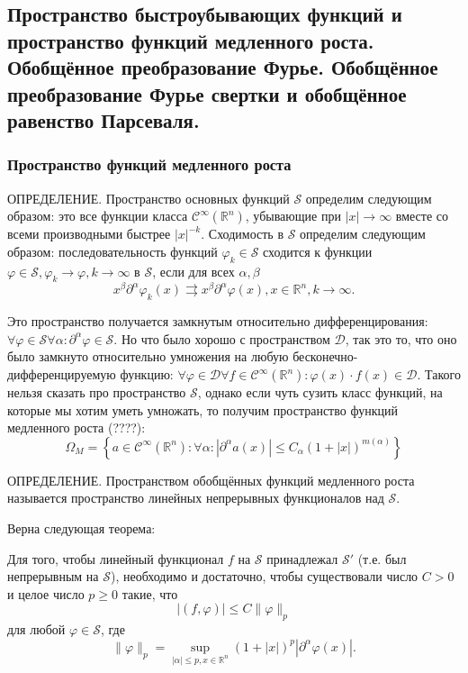 \subsection{Пространство быстроубывающих функций и пространство функций медленного роста.
Обобщённое преобразование Фурье. Обобщённое преобразование Фурье свертки и обобщённое равенство
Парсеваля.}

\subsubsection{Пространство функций медленного роста}

ОПРЕДЕЛЕНИЕ. Пространство основных функций $\mathcal{S}$ определим следующим образом: это все
функции класса $\mathcal{C}^\infty (\mathbb{R}^n)$, убывающие при $|x| \to \infty$ вместе со всеми
производными быстрее $|x|^{-k}$. Сходимость в $\mathcal{S}$ определим следующим образом:
последовательность функций $\varphi_k \in \mathcal{S}$ сходится к функции
$\varphi \in \mathcal{S}, \varphi_k \to \varphi, k \to \infty \text{ в } \mathcal{S}$, если для
всех $\alpha, \beta$
\[
  x^\beta \partial^\alpha \varphi_k (x) \rightrightarrows x^\beta \partial^\alpha \varphi(x), x\in\mathbb{R}^n, k \to \infty.
\]

Это пространство получается замкнутым относительно дифференцирования:
$\forall \varphi \in \mathcal{S} \forall \alpha : \partial^\alpha \varphi \in \mathcal{S}$.
Но что было хорошо с пространством $\mathcal{D}$, так это то, что оно было замкнуто относительно
умножения на любую бесконечно-дифференцируемую функцию:
$\forall \varphi \in \mathcal{D} \forall f \in \mathcal{C}^\infty (\mathbb{R}^n) : \varphi(x) \cdot f(x) \in \mathcal{D}$. Такого нельзя сказать про пространство $\mathcal{S}$, однако если чуть
сузить класс функций, на которые мы хотим уметь умножать, то получим пространство функций медленного
роста (????):
\[
  \Omega_M = \left\{ a\in\mathcal{C}^\infty(\mathbb{R}^n) :
    \forall\alpha : \left| \partial^\alpha a(x) \right|
      \leqslant C_\alpha (1+|x|)^{m(\alpha)} \right\} 
\]

ОПРЕДЕЛЕНИЕ. Пространством обобщённых функций медленного роста называется пространство линейных
непрерывных функционалов над $\mathcal{S}$.

Верна следующая теорема:
\begin{theorem}[Л. Шварц]
  Для того, чтобы линейный функционал $f$ на $\mathcal{S}$ принадлежал $\mathcal{S}'$ (т.е. был
  непрерывным на $\mathcal{S}$), необходимо и достаточно, чтобы существовали число $C>0$ и целое
  число $p\geqslant 0$ такие, что
  \[
    |(f, \varphi)| \leqslant C \|\varphi\|_p
  \]
  для любой $\varphi \in \mathcal{S}$, где
  \[
    \|\varphi\|_p = \sup_{|\alpha| \leqslant p, x\in\mathbb{R}^n} (1+|x|)^p |\partial^\alpha \varphi(x)|.
  \]
\end{theorem}

